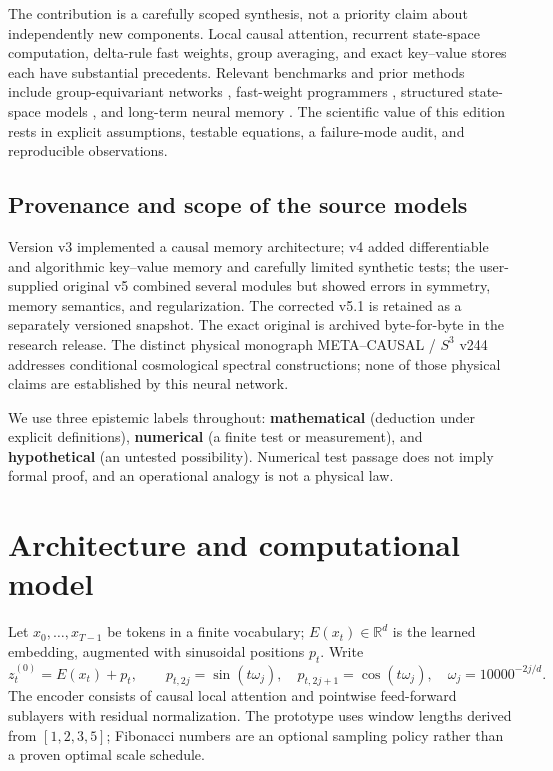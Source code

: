 \documentclass[11pt,a4paper]{article}
\theoremstyle{plain}\newtheorem{theorem}{Theorem}[section]\newtheorem{proposition}[theorem]{Proposition}\newtheorem{lemma}[theorem]{Lemma}
\theoremstyle{definition}\newtheorem{definition}[theorem]{Definition}\newtheorem{remark}[theorem]{Remark}\newtheorem{counterexample}[theorem]{Counterexample}
\newcommand{\R}{\mathbb R}\newcommand{\C}{\mathbb C}\newcommand{\Z}{\mathbb Z}\newcommand{\EE}{\mathbb E}\newcommand{\norm}[1]{\left\lVert #1\right\rVert}\newcommand{\tr}{\operatorname{tr}}\newcommand{\rank}{\operatorname{rank}}\newcommand{\diag}{\operatorname{diag}}\newcommand{\softmax}{\operatorname{softmax}}\newcommand{\Span}{\operatorname{span}}\newcommand{\NOTE}{\textsc{Status:}}
\begin{document}
The contribution is a carefully scoped synthesis, not a priority claim about independently new components. Local causal attention, recurrent state-space computation, delta-rule fast weights, group averaging, and exact key--value stores each have substantial precedents. Relevant benchmarks and prior methods include group-equivariant networks \cite{cohen2016,bronstein2021}, fast-weight programmers \cite{schlag2021}, structured state-space models \cite{dao2024,gu2022}, and long-term neural memory \cite{behrouz2025}. The scientific value of this edition rests in explicit assumptions, testable equations, a failure-mode audit, and reproducible observations.

\subsection{Provenance and scope of the source models}
Version v3 implemented a causal memory architecture; v4 added differentiable and algorithmic key--value memory and carefully limited synthetic tests; the user-supplied original v5 combined several modules but showed errors in symmetry, memory semantics, and regularization. The corrected v5.1 is retained as a separately versioned snapshot. The exact original is archived byte-for-byte in the research release. The distinct physical monograph META--CAUSAL / $S^3$ v244 addresses conditional cosmological spectral constructions; none of those physical claims are established by this neural network.

We use three epistemic labels throughout: \textbf{mathematical} (deduction under explicit definitions), \textbf{numerical} (a finite test or measurement), and \textbf{hypothetical} (an untested possibility). Numerical test passage does not imply formal proof, and an operational analogy is not a physical law.

\section{Architecture and computational model}
Let $x_0,\ldots,x_{T-1}$ be tokens in a finite vocabulary; $E(x_t)\in\R^d$ is the learned embedding, augmented with sinusoidal positions $p_t$. Write
\begin{equation}
 z_t^{(0)}=E(x_t)+p_t,\qquad
 p_{t,2j}=\sin(t\omega_j),\quad p_{t,2j+1}=\cos(t\omega_j),\quad \omega_j=10000^{-2j/d}.
\end{equation}
The encoder consists of causal local attention and pointwise feed-forward sublayers with residual normalization. The prototype uses window lengths derived from $[1,2,3,5]$; Fibonacci numbers are an optional sampling policy rather than a proven optimal scale schedule.
\end{document}
